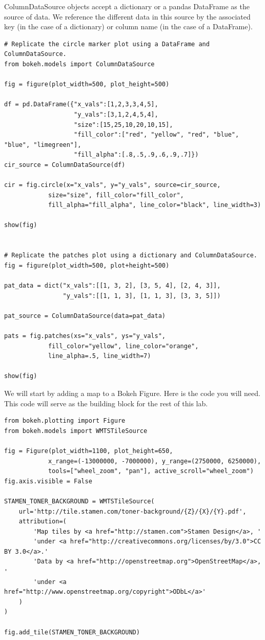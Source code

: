 ColumnDataSource objects accept a dictionary or a pandas DataFrame as the source
of data. We reference the different data in this source by the associated key
(in the case of a dictionary) or column name (in the case of a DataFrame).

\begin{lstlisting}
# Replicate the circle marker plot using a DataFrame and ColumnDataSource.
from bokeh.models import ColumnDataSource

fig = figure(plot_width=500, plot_height=500)

df = pd.DataFrame({"x_vals":[1,2,3,3,4,5],
                   "y_vals":[3,1,2,4,5,4],
                   "size":[15,25,10,20,10,15],
                   "fill_color":["red", "yellow", "red", "blue", "blue", "limegreen"],
                   "fill_alpha":[.8,.5,.9,.6,.9,.7]})
cir_source = ColumnDataSource(df)

cir = fig.circle(x="x_vals", y="y_vals", source=cir_source,
            size="size", fill_color="fill_color",
            fill_alpha="fill_alpha", line_color="black", line_width=3)

show(fig)


# Replicate the patches plot using a dictionary and ColumnDataSource.
fig = figure(plot_width=500, plot+height=500)

pat_data = dict("x_vals":[[1, 3, 2], [3, 5, 4], [2, 4, 3]],
                "y_vals":[[1, 1, 3], [1, 1, 3], [3, 3, 5]])

pat_source = ColumnDataSource(data=pat_data)

pats = fig.patches(xs="x_vals", ys="y_vals",
            fill_color="yellow", line_color="orange",
            line_alpha=.5, line_width=7)

show(fig)
\end{lstlisting}

\begin{problem} \label{prob:map}
We will start by adding a map to a Bokeh Figure. Here is the code you will need.
This code will serve as the building block for the rest of this lab.

\begin{lstlisting}
from bokeh.plotting import Figure
from bokeh.models import WMTSTileSource

fig = Figure(plot_width=1100, plot_height=650,
            x_range=(-13000000, -7000000), y_range=(2750000, 6250000),
            tools=["wheel_zoom", "pan"], active_scroll="wheel_zoom")
fig.axis.visible = False

STAMEN_TONER_BACKGROUND = WMTSTileSource(
    url='http://tile.stamen.com/toner-background/{Z}/{X}/{Y}.pdf',
    attribution=(
        'Map tiles by <a href="http://stamen.com">Stamen Design</a>, '
        'under <a href="http://creativecommons.org/licenses/by/3.0">CC BY 3.0</a>.'
        'Data by <a href="http://openstreetmap.org">OpenStreetMap</a>, '
        'under <a href="http://www.openstreetmap.org/copyright">ODbL</a>'
    )
)

fig.add_tile(STAMEN_TONER_BACKGROUND)
\end{lstlisting}

\end{problem}

